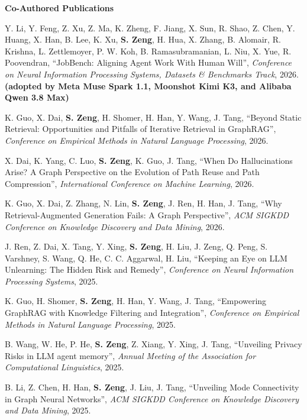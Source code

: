 \documentclass[11pt,a4paper,roman]{moderncv}        %
\newenvironment{publist}{%
  \begin{list}{}{%
    \setlength{\leftmargin}{34mm}%
    \setlength{\labelwidth}{32mm}%
    \setlength{\labelsep}{2mm}%
    \setlength{\itemsep}{1.4mm}%
    \setlength{\parsep}{0pt}%
    \setlength{\topsep}{1.5mm}%
    \renewcommand{\makelabel}[1]{\bfseries ##1\hfill}%
  }}{\end{list}}
\begin{document}
\vspace{2mm}
{\large\bfseries Co-Authored Publications}
\vspace{-1mm}
\begin{publist}
\item[{[NeurIPS'26]}] Y. Li, Y. Feng, Z. Xu, Z. Ma, K. Zheng, F. Jiang, X. Sun, R. Shao, Z. Chen, Y. Huang, X. Han, B. Lee, K. Xu, \textbf{S. Zeng}, H. Hua, X. Zhang, B. Alomair, R. Krishna, L. Zettlemoyer, P. W. Koh, B. Ramasubramanian, L. Niu, X. Yue, R. Poovendran, ``JobBench: Aligning Agent Work With Human Will'', \textit{Conference on Neural Information Processing Systems, Datasets \& Benchmarks Track}, 2026. \textbf{(adopted by Meta Muse Spark 1.1, Moonshot Kimi K3, and Alibaba Qwen 3.8 Max)}
\item[{[EMNLP'26]}] K. Guo, X. Dai, \textbf{S. Zeng}, H. Shomer, H. Han, Y. Wang, J. Tang, ``Beyond Static Retrieval: Opportunities and Pitfalls of Iterative Retrieval in GraphRAG'', \textit{Conference on Empirical Methods in Natural Language Processing}, 2026.
\item[{[ICML'26]}] X. Dai, K. Yang, C. Luo, \textbf{S. Zeng}, K. Guo, J. Tang, ``When Do Hallucinations Arise? A Graph Perspective on the Evolution of Path Reuse and Path Compression'', \textit{International Conference on Machine Learning}, 2026.
\item[{[KDD'26]}] K. Guo, X. Dai, Z. Zhang, N. Lin, \textbf{S. Zeng}, J. Ren, H. Han, J. Tang, ``Why Retrieval-Augmented Generation Fails: A Graph Perspective'', \textit{ACM SIGKDD Conference on Knowledge Discovery and Data Mining}, 2026.
\item[{[NeurIPS'25]}] J. Ren, Z. Dai, X. Tang, Y. Xing, \textbf{S. Zeng}, H. Liu, J. Zeng, Q. Peng, S. Varshney, S. Wang, Q. He, C. C. Aggarwal, H. Liu, ``Keeping an Eye on LLM Unlearning: The Hidden Risk and Remedy'', \textit{Conference on Neural Information Processing Systems}, 2025.
\item[{[EMNLP'25]}] K. Guo, H. Shomer, \textbf{S. Zeng}, H. Han, Y. Wang, J. Tang, ``Empowering GraphRAG with Knowledge Filtering and Integration'', \textit{Conference on Empirical Methods in Natural Language Processing}, 2025.
\item[{[ACL'25]}] B. Wang, W. He, P. He, \textbf{S. Zeng}, Z. Xiang, Y. Xing, J. Tang, ``Unveiling Privacy Risks in LLM agent memory'', \textit{Annual Meeting of the Association for Computational Linguistics}, 2025.
\item[{[KDD'25]}] B. Li, Z. Chen, H. Han, \textbf{S. Zeng}, J. Liu, J. Tang, ``Unveiling Mode Connectivity in Graph Neural Networks'', \textit{ACM SIGKDD Conference on Knowledge Discovery and Data Mining}, 2025.

\end{publist}
\end{document}
